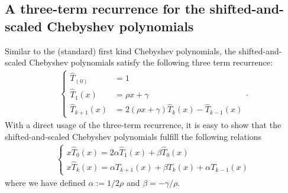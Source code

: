 \documentclass[a4paper,10pt]{article}
\theoremstyle{plain}
\begin{document}
\subsection{A three-term recurrence for the shifted-and-scaled Chebyshev polynomials}
Similar to the (standard) first kind Chebyshev polynomials, the shifted-and-scaled Chebyshev polynomials satisfy the following three term recurrence:
\begin{align*}
 \begin{cases}
  \hat T_(0) 		&= 1	\\
  \hat T_1(x)		&= \rho x + \gamma \\
  \hat T_{k+1}(x)	&= 2(\rho x + \gamma) \hat T_k(x) - \hat T_{k-1}(x)
 \end{cases}.
\end{align*}
With a direct usage of the three-term recurrence, it is easy to show that the shifted-and-scaled Chebyshev polynomials fulfill the following relations
\begin{align} \label{eq:T_relations}
 \begin{cases}
  x \hat T_0(x) = 2 \alpha \hat T_1(x) + \beta \hat T_{0}(x)	\\
  x \hat T_k(x) = \alpha T_{k+1} (x) + \beta T_{k} (x) + \alpha T_{k-1} (x) 
 \end{cases}
\end{align}
where we have defined $\alpha:=1/2\rho$ and $\beta=-\gamma/\rho$. 
\end{document}
